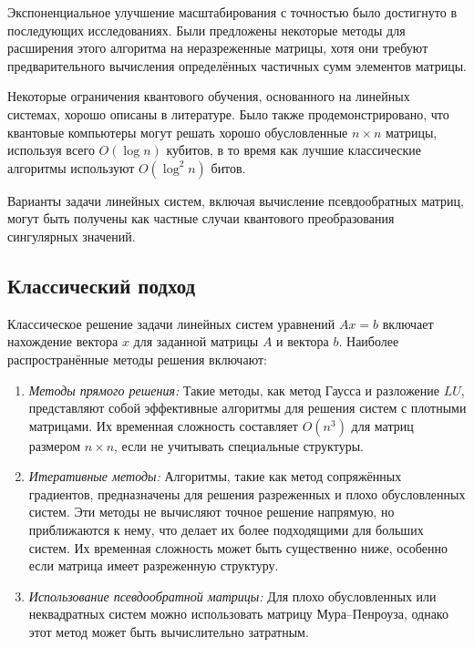 Экспоненциальное улучшение масштабирования с точностью было достигнуто в последующих исследованиях. Были предложены некоторые методы для расширения этого алгоритма на неразреженные матрицы, хотя они требуют предварительного вычисления определённых частичных сумм элементов матрицы. 

Некоторые ограничения квантового обучения, основанного на линейных системах, хорошо описаны в литературе. Было также продемонстрировано, что квантовые компьютеры могут решать хорошо обусловленные $n \times n$ матрицы, используя всего $O(\log n)$ кубитов, в то время как лучшие классические алгоритмы используют $O(\log^2 n)$ битов. 

Варианты задачи линейных систем, включая вычисление псевдообратных матриц, могут быть получены как частные случаи квантового преобразования сингулярных значений.

\subsection*{Классический подход}

Классическое решение задачи линейных систем уравнений $Ax = b$ включает нахождение вектора $x$ для заданной матрицы $A$ и вектора $b$. Наиболее распространённые методы решения включают:

\begin{enumerate}
 \item \emph{Методы прямого решения:} Такие методы, как метод Гаусса и разложение $LU$, представляют собой эффективные алгоритмы для решения систем с плотными матрицами. Их временная сложность составляет $O(n^3)$ для матриц размером $n \times n$, если не учитывать специальные структуры.\\
 
 \item \emph{Итеративные методы:} Алгоритмы, такие как метод сопряжённых градиентов, предназначены для решения разреженных и плохо обусловленных систем. Эти методы не вычисляют точное решение напрямую, но приближаются к нему, что делает их более подходящими для больших систем. Их временная сложность может быть существенно ниже, особенно если матрица имеет разреженную структуру.\\
 
 \item \emph{Использование псевдообратной матрицы:} Для плохо обусловленных или неквадратных систем можно использовать матрицу Мура–Пенроуза, однако этот метод может быть вычислительно затратным.\\
\end{enumerate}

